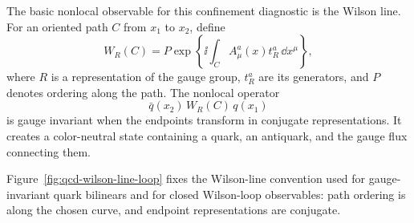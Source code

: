 The basic nonlocal observable for this confinement diagnostic is the Wilson
line.  For an oriented path \(C\) from \(x_1\) to \(x_2\), define
\begin{equation}
  W_R(C)
  =
  P\exp\left\{
    \ii\int_C A_\mu^a(x)t_R^a\,\dd x^\mu
  \right\},
  \label{eq:qcd-wilson-line-definition}
\end{equation}
where \(R\) is a representation of the gauge group, \(t_R^a\) are its
generators, and \(P\) denotes ordering along the path.  The nonlocal operator
\[
  \bar q(x_2)\,W_R(C)\,q(x_1)
\]
is gauge invariant when the endpoints transform in conjugate representations.
It creates a color-neutral state containing a quark, an antiquark, and the
gauge flux connecting them.

Figure~\ref{fig:qcd-wilson-line-loop} fixes the Wilson-line convention used for
gauge-invariant quark bilinears and for closed Wilson-loop observables: path
ordering is along the chosen curve, and endpoint representations are conjugate.

